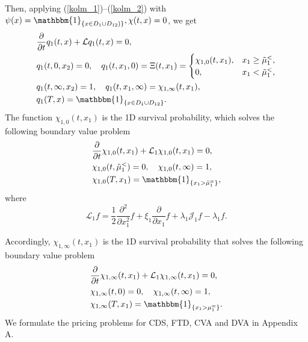 Then, applying (\ref{kolm_1})--(\ref{kolm_2}) with $\psi(x) = \mathbbm{1}_{\{x \in D_1 \cup D_{12})\}}, \chi(t, x) = 0$, we get
\begin{equation}
\begin{aligned}
		& \frac{\partial}{\partial t} q_1(t, x) + \mathcal{L} q_1(t, x) = 0, \\
		& q_1(t, 0, x_2) = 0, \quad
		q_1(t, x_1, 0) = \Xi(t, x_1) = 
		\begin{cases}
			\chi_{1,0}(t, x_1), & x_1 \ge \tilde{\mu}_1^{<}, \\
			0, & x_1 < \tilde{\mu}_1^{<},
		\end{cases} \\
		& q_1(t, \infty, x_2) = 1, \quad
		q_1(t, x_1, \infty) = 
			\chi_{1,\infty}(t, x_1), \\
		& q_1(T, x) = \mathbbm{1}_{\{x \in D_1 \cup D_{12} \}}.
\end{aligned}
\end{equation}
The function $\chi_{1, 0}(t, x_1)$ is the 1D survival probability, which solves the following boundary value problem
\begin{equation}
	\begin{aligned}
		& \frac{\partial}{\partial t} \chi_{1, 0}(t, x_1) + \mathcal{L}_1 \chi_{1, 0}(t, x_1)= 0, \\
		& \chi_{1, 0}(t, \tilde{\mu}_1^{<}) = 0, \quad \chi_{1, 0}(t, \infty) = 1, \\
		& \chi_{1, 0}(T, x_1) = \mathbbm{1}_{\{x_1 > \tilde{\mu}_1^{=}\}},
	\end{aligned}
\end{equation}
where
\begin{equation*}
	\mathcal{L}_1 f = \frac{1}{2} \frac{\partial^2}{\partial x_1^2} f + \xi_1 \frac{\partial}{\partial x_1} f + \lambda_1 \mathcal{J}_1 f - \lambda_1 f.
\end{equation*}

Accordingly, $\chi_{1, \infty}(t, x_1)$ is the 1D survival probability that solves the following boundary value problem
\begin{equation}
	\begin{aligned}
		& \frac{\partial}{\partial t} \chi_{1, \infty}(t, x_1) + \mathcal{L}_1 \chi_{1, \infty}(t, x_1)= 0, \\
		& \chi_{1, \infty}(t,  0) = 0, \quad \chi_{1, \infty}(t, \infty) = 1, \\
		& \chi_{1, \infty}(T, x_1) = \mathbbm{1}_{\{x_1 > \mu_1^{=}\}}.
	\end{aligned}
\end{equation}
We formulate the pricing problems for CDS, FTD, CVA and DVA in Appendix A.
